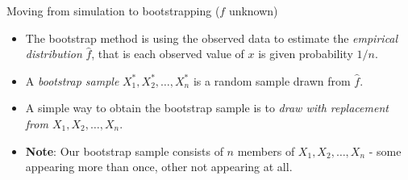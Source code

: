 \documentclass[
  10pt,
  ignorenonframetext,
]{beamer}
\providecommand{\tightlist}{%
  \setlength{\itemsep}{0pt}\setlength{\parskip}{0pt}}
\begin{document}
\begin{frame}
\begin{block}{Moving from simulation to bootstrapping (\(f\) unknown)}
\protect\hypertarget{moving-from-simulation-to-bootstrapping-f-unknown}{}
\(~\)

\begin{itemize}
\tightlist
\item
  The bootstrap method is using the observed data to estimate the
  \emph{empirical distribution} \(\hat{f}\), that is each observed value
  of \(x\) is given probability \(1/n\).
\end{itemize}

\vspace{2mm}

\begin{itemize}
\tightlist
\item
  A \emph{bootstrap sample} \(X^*_1,X^*_2,\ldots, X^*_n\) is a random
  sample drawn from \(\hat{f}\).
\end{itemize}

\vspace{2mm}

\begin{itemize}
\tightlist
\item
  A simple way to obtain the bootstrap sample is to \emph{draw with
  replacement from \(X_1, X_2, \ldots, X_n\)}.
\end{itemize}

\vspace{2mm}

\begin{itemize}
\tightlist
\item
  \textbf{Note}: Our bootstrap sample consists of \(n\) members of
  \(X_1, X_2, \ldots, X_n\) - some appearing more than once, other not
  appearing at all.
\end{itemize}
\end{block}
\end{frame}
\end{document}
